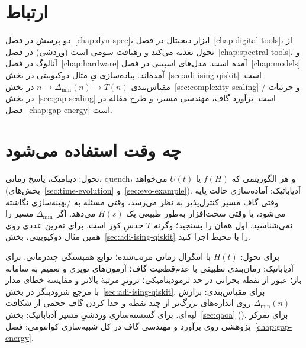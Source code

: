 \section{ارتباط}

دو پرسش در فصل~\ref{chap:dyn-spec}، ابزار دیجیتال در فصل~\ref{chap:digital-tools}،  از تحول تغذیه می‌کند و  رهیافت سومی است (وردشی) در فصل~\ref{chap:spectral-tools}، و آنالوگ در فصل~\ref{chap:hardware} آمده است. مدل‌های اسپینی در فصل~\ref{chap:models} آمده‌اند. پیاده‌سازی یِ مثال دوکیوبیتی در بخش~\ref{sec:adi-ising-qiskit} است. مقیاس‌بندی $n\to\Delta_{\min}(n)\to T(n)$ در بخش~\ref{sec:complexity-scaling} و جزئیات / در بخش~\ref{sec:gap-scaling} است. برآورد گاف، مهندسی مسیر، و طرح مقاله در فصل~\ref{chap:gap-energy} است.

\section{چه وقت استفاده می‌شود}

تحول: دینامیک، پاسخ زمانی، quench، و هر الگوریتمی که $f(H)$ یا $U(t)$ می‌خواهد (بخش‌های~\ref{sec:time-evolution} و~\ref{sec:evo-example}). آدیاباتیک: آماده‌سازی حالت پایه وقتی گاف مسیر کنترل‌پذیر به نظر می‌رسد، وقتی مسئله به /بهینه‌سازی نگاشته می‌شود، یا وقتی سخت‌افزار به‌طور طبیعی یک $H(s)$ می‌دهد. اگر $\Delta_{\min}$ مسیر را نمی‌شناسید، اول همان را بسنجید؛ وگرنه $T$ حدسِ کور است. برای تمرین عددی روی همین مثال دوکیوبیتی، بخش~\ref{sec:adi-ising-qiskit} را با محیط  اجرا کنید.

\begin{remark}
	برای تحول: $H(t)$ با انتگرال زمانی مرتب‌شده؛ توابع همبستگی چندزمانی. برای آدیاباتیک: زمان‌بندی تطبیقی با عدم‌قطعیت گاف؛ آزمون‌های نویزی و تعمیم به سامانه باز؛ عبور از نقطه بحرانی در حد ترمودینامیکی؛ تروترِ مرتبهٔ بالاتر و مقایسهٔ خطای مدار با مرجع شرودینگر در بخش~\ref{sec:adi-ising-qiskit}. برای مقیاس‌بندی: برازش $\Delta_{\min}(n)$ روی اندازه‌های بزرگ‌تر از چند نقطه و جدا کردن گاف حجمی از شکافت لبه‌ای. برای گسسته‌سازی وردشیِ مسیر آدیاباتیک: بخش~\ref{sec:qaoa} (). برای تمرکز پژوهشی روی برآورد و مهندسی گاف در کل شبیه‌سازی کوانتومی: فصل~\ref{chap:gap-energy}.
\end{remark}